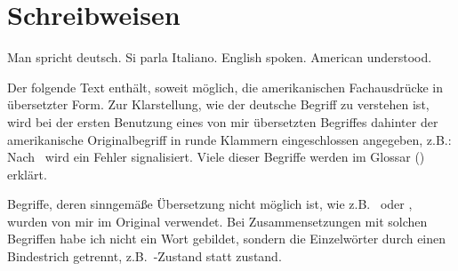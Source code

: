 \section{Schreibweisen}
%
\begin{fortune}
Man spricht deutsch. Si parla Italiano. English spoken.
American understood.
\end{fortune}
%
Der folgende Text enth\"{a}lt, soweit m\"{o}glich, die amerikanischen
Fachausdr\"{u}cke in \"{u}bersetzter Form. Zur Klarstellung, wie der
deutsche Begriff zu verstehen ist, wird bei der ersten Benutzung eines
von mir \"{u}bersetzten Begriffes dahinter der amerikanische
Originalbegriff in runde Klammern eingeschlossen angegeben,
z.B.: Nach \ wird
ein Fehler signalisiert. Viele dieser Begriffe werden im Glossar
(\citepage{\pageref{chap:glossary}}) erkl\"{a}rt.
%
\par{}Begriffe, deren sinngem\"{a}\ss{}e \"{U}bersetzung nicht m\"{o}glich ist, wie
z.B.\ \Slt\/ oder \cache, wurden von mir im Original verwendet.  Bei
Zusammensetzungen mit solchen Begriffen habe ich nicht ein Wort
gebildet, sondern die Einzelw\"{o}rter durch einen Bindestrich getrennt,
z.B.\ \Slt\/-Zustand statt \rglq{}\Slt\/zustand\rgrq.
%
